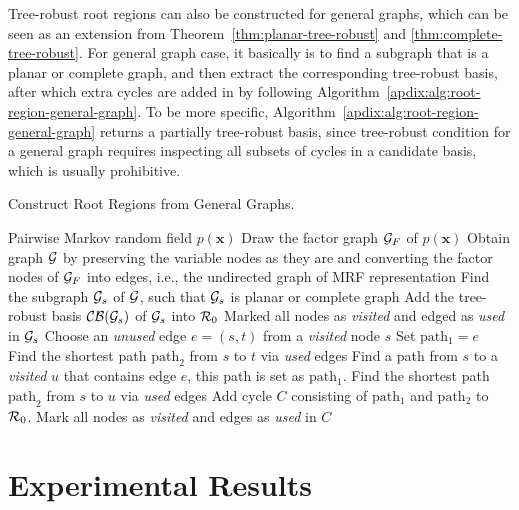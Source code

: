 Tree-robust root regions can also be constructed for general graphs, which can be seen as an extension from Theorem~\ref{thm:planar-tree-robust} and \ref{thm:complete-tree-robust}. For general graph case, it basically is to find a subgraph that is a planar or complete graph, and then extract the corresponding tree-robust basis, after which extra cycles are added in by following Algorithm~\ref{apdix:alg:root-region-general-graph}. To be more specific, Algorithm~\ref{apdix:alg:root-region-general-graph} returns a partially tree-robust basis, since tree-robust condition for a general graph requires inspecting all subsets of cycles in a candidate basis, which is usually prohibitive. 
\begin{algorithm}[tb]
  \caption{Construct Root Regions from General Graphs.}
  \label{apdix:alg:root-region-general-graph}
  \begin{algorithmic}
     Pairwise Markov random field $p(\bm{x})$
    \STATE Draw the factor graph $\mathcal{G}_F$ of $p(\bm{x})$
    \STATE Obtain graph $\mathcal{G}$ by preserving the variable nodes as they are and converting the factor nodes of $\mathcal{G}_F$ into edges, i.e., the undirected graph of MRF representation
    \STATE Find the subgraph $\mathcal{G}_s$ of $\mathcal{G}$, such that $\mathcal{G}_s$ is planar or complete graph
    \STATE Add the tree-robust basis $\mathcal{C}\mathcal{B}(\mathcal{G}_s)$ of $\mathcal{G}_s$ into $\mathcal{R}_0$
    \STATE Marked all nodes as \textit{visited} and edged as \textit{used} in $\mathcal{G}_s$
    \REPEAT
    \STATE Choose an \textit{unused} edge $e = (s,t)$ from a \textit{visited} node $s$
    \STATE Set $\mathrm{path_1} = e$
    \STATE Find the shortest path $\mathrm{path}_2$ from $s$ to $t$
    via \textit{used} edges
    \ELSE
    \STATE Find a path from $s$ to a \textit{visited} $u$ that
    contains edge $e$, this path is set as $\mathrm{path_1}$.
    \STATE Find the shortest path $\mathrm{path}_2$ from $s$ to $u$
    via \textit{used} edges
    \ENDIF
    \STATE Add cycle $C$ consisting of $\mathrm{path_1}$ and
    $\mathrm{path_2}$ to $\mathcal{R}_0$.
    \STATE Mark all nodes as \textit{visited} and edges as
    \textit{used} in $C$
  \end{algorithmic}
\end{algorithm}





\section{Experimental Results}\label{chpt4:sec:experiments}

